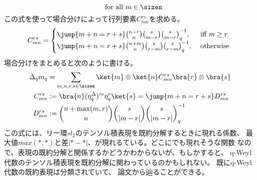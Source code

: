 {\begin{equation*}
\begin{split}
	\end{split}
		\quad\text{for all } m\in\sizen
	\end{equation*}
	この式を使って場合分けによって行列要素$C_{mn}^{rs}$を求める。
	\begin{equation*}\begin{split}
		C_{mn}^{rs} = \begin{cases}
			\jump{m+n=r+s}\binom{n+r}{n}\binom{s}{m-r}\binom{s}{m-r}_q^{-1}
				, &\text{ iff } m\ge r \\
			\jump{m+n=r+s}\binom{n+m}{n}\binom{s}{r-m}\binom{s}{r-m}_q^{-1}
				, &\text{ otherwise } \\
		\end{cases}
	\end{split}\end{equation*}
	場合分けをまとめると次のように書ける。
	\begin{equation}\label{eq:Deltamその一}\begin{split}
		\Delta_qm_q &= \sum_{m,n,r,s\in\sizen}
			\ket{m}\otimes\ket{n}C_{mn}^{rs}\bra{r}\otimes\bra{s} \\
		C_{mn}^{rs} &:= \bra{n}(\eta_q^\Delta)^m\eta_q^r\ket{s} 
			= \jump{m+n=r+s}D_{mn}^{rs} \\
		D_{mn}^{rs} &:= \binom{n+\max(m,r)}{n}
			\binom{s}{|m-r|}\binom{s}{|m-r|}_q^{-1}
	\end{split}\end{equation}
	この式には、リー環$sl_2$のテンソル積表現を既約分解するときに現れる係数、
	最大値$max(*,*)$と差$|*-*|$、が現れるている。どこにでも現れそうな関数
	なので、表現の既約分解と関係するかどうかわからないが、もしかすると、
	q-Weyl代数のテンソル積表現を既約分解に関わっているのかもしれない。
	既にq-Weyl代数の既約表現は分類されていて、
	論文\cite{2012arXiv1203.1959H}から辿ることができる。

}
